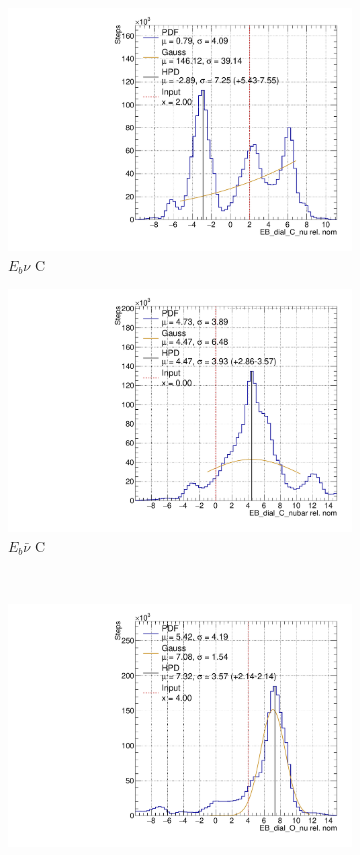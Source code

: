 \begin{figure}[t]
\centering
\begin{subfigure}{.48\textwidth}
  \centering
  \includegraphics[width=0.73\linewidth]{figs/EB_dial_C_nuData}
  \caption{$E_{b}\nu$ C}
\end{subfigure}
\begin{subfigure}{.48\textwidth}
  \centering
  \includegraphics[width=0.73\linewidth]{figs/EB_dial_C_nubarData}
  \caption{$E_{b}\bar{\nu}$ C}
\end{subfigure} \\
\begin{subfigure}{.48\textwidth}
  \centering
  \includegraphics[width=0.73\linewidth]{figs/EB_dial_O_nuData}

\end{subfigure}
\end{figure}

